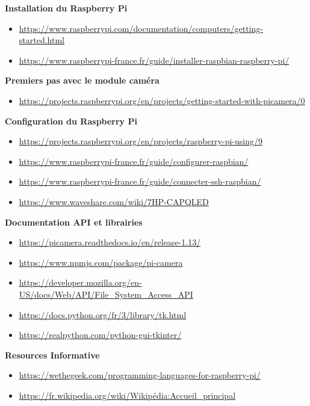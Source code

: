 \begin{thebibliography}{9}
    \textbf{Installation du Raspberry Pi}
    \begin{itemize}
        \item \footnotesize{\url{https://www.raspberrypi.com/documentation/computers/getting-started.html}}
        \item \footnotesize{\url{https://www.raspberrypi-france.fr/guide/installer-raspbian-raspberry-pi/}}
    \end{itemize}

    \textbf{Premiers pas avec le module caméra}
    \begin{itemize}
        \item \footnotesize{\url{https://projects.raspberrypi.org/en/projects/getting-started-with-picamera/0}}
    \end{itemize}

    \textbf{Configuration du Raspberry Pi}
    \begin{itemize}
        \item \footnotesize{\url{https://projects.raspberrypi.org/en/projects/raspberry-pi-using/9}}
        \item \footnotesize{\url{https://www.raspberrypi-france.fr/guide/configurer-raspbian/}}
        \item \footnotesize{\url{https://www.raspberrypi-france.fr/guide/connecter-ssh-raspbian/}}
        \item \footnotesize{\url{https://www.waveshare.com/wiki/7HP-CAPQLED}}
    \end{itemize}    

    \textbf{Documentation API et librairies}
    \begin{itemize}
        \item \footnotesize{\url{https://picamera.readthedocs.io/en/release-1.13/}}
        \item \footnotesize{\url{https://www.npmjs.com/package/pi-camera}}
        \item \footnotesize{\url{https://developer.mozilla.org/en-US/docs/Web/API/File_System_Access_API}}
        \item \footnotesize{\url{https://docs.python.org/fr/3/library/tk.html}}
        \item \footnotesize{\url{https://realpython.com/python-gui-tkinter/}}
    \end{itemize}

    \textbf{Resources Informative}
    \begin{itemize}
        \item \footnotesize{\url{https://wethegeek.com/programming-languages-for-raspberry-pi/}}
        \item \footnotesize{\url{https://fr.wikipedia.org/wiki/Wikipédia:Accueil_principal}}
    \end{itemize}
    
\end{thebibliography}
